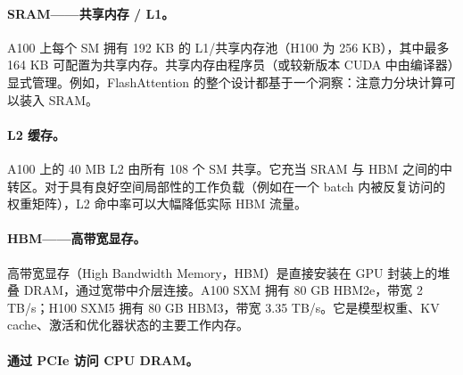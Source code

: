 \paragraph{SRAM——共享内存 / L1。}
\label{sram-shared-memory-l1.}

A100 上每个 SM 拥有 192 KB 的 L1/共享内存池（H100 为 256 KB），其中最多 164 KB 可配置为共享内存。共享内存由程序员（或较新版本 CUDA 中由编译器）显式管理。例如，FlashAttention 的整个设计都基于一个洞察：注意力分块计算可以装入 SRAM。

\paragraph{L2 缓存。}
\label{l2-cache.}

A100 上的 40 MB L2 由所有 108 个 SM 共享。它充当 SRAM 与 HBM 之间的中转区。对于具有良好空间局部性的工作负载（例如在一个 batch 内被反复访问的权重矩阵），L2 命中率可以大幅降低实际 HBM 流量。

\paragraph{HBM——高带宽显存。}
\label{hbm-high-bandwidth-memory.}

高带宽显存（High Bandwidth Memory，HBM）是直接安装在 GPU 封装上的堆叠 DRAM，通过宽带中介层连接。A100 SXM 拥有 80 GB HBM2e，带宽 2 TB/s；H100 SXM5 拥有 80 GB HBM3，带宽 3.35 TB/s。它是模型权重、KV cache、激活和优化器状态的主要工作内存。

\paragraph{通过 PCIe 访问 CPU DRAM。}
\label{cpu-dram-via-pcie.}

